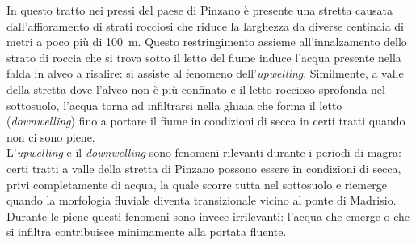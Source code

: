 In questo tratto nei pressi del paese di Pinzano è presente una stretta causata dall'affioramento di strati rocciosi che riduce la larghezza da diverse centinaia di metri a poco più di \SI{100}{\m}.
Questo restringimento assieme all'innalzamento dello strato di roccia che si trova sotto il letto del fiume induce l'acqua presente nella falda in alveo a risalire: si assiste al fenomeno dell'\emph{upwelling}. 
Similmente, a valle della stretta dove l'alveo non è più confinato e il letto roccioso sprofonda nel sottosuolo, l'acqua torna ad infiltrarsi nella ghiaia che forma il letto (\emph{downwelling}) fino a portare il fiume in condizioni di secca in certi tratti quando non ci sono piene.
\\
L'\emph{upwelling} e il \emph{downwelling} sono fenomeni rilevanti durante i periodi di magra: certi tratti a valle della stretta di Pinzano possono essere in condizioni di secca, privi completamente di acqua, la quale scorre tutta nel sottosuolo e riemerge quando la morfologia fluviale diventa transizionale vicino al ponte di Madrisio.
Durante le piene questi fenomeni sono invece irrilevanti: l'acqua che emerge o che si infiltra contribuisce minimamente alla portata fluente.

